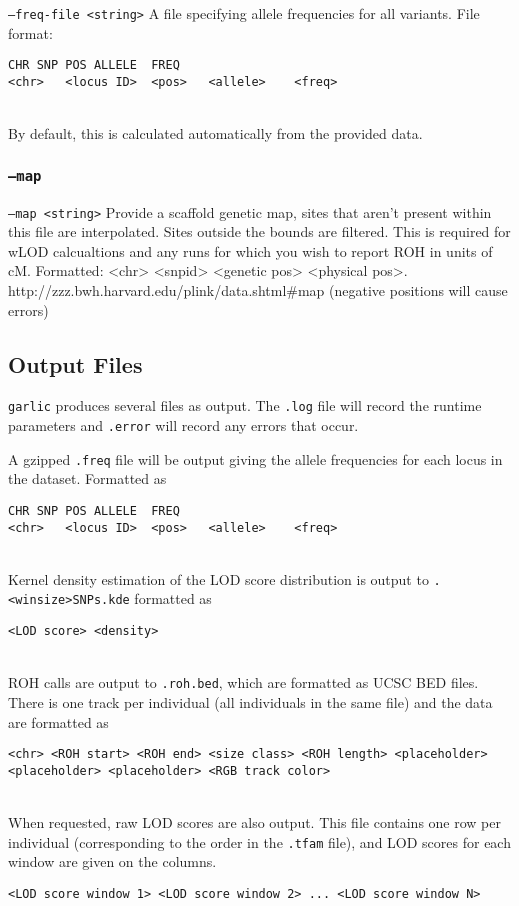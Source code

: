 \documentclass[12pt]{article}%
\begin{document}
{\tt --freq-file <string>} A file specifying allele frequencies for all variants. File format:
\begin{lstlisting}
CHR	SNP	POS	ALLELE	FREQ 
<chr>	<locus ID>	<pos>	<allele>	<freq>
\end{lstlisting}
~\\
\noindent By default, this is calculated automatically from the provided data.

\subsubsection{{\tt --map}}

{\tt --map <string>} Provide a scaffold genetic map, sites that aren't present within this file are interpolated.  Sites outside the bounds are filtered. This is required for wLOD calcualtions and any runs for which you wish to report ROH in units of cM. 
Formatted: <chr> <snpid> <genetic pos> <physical pos>. http://zzz.bwh.harvard.edu/plink/data.shtml\#map (negative positions will cause errors)

\subsection{Output Files}

{\tt garlic} produces several files as output.  The {\tt .log} file will record the runtime parameters and {\tt .error} will record any errors that occur.  

A gzipped {\tt .freq} file will be output giving the allele frequencies for each locus in the dataset.  Formatted as
\begin{lstlisting}
CHR	SNP	POS	ALLELE	FREQ
<chr>	<locus ID>	<pos>	<allele>	<freq>
\end{lstlisting}
~\\
Kernel density estimation of the LOD score distribution is output to {\tt .<winsize>SNPs.kde} formatted as
\begin{lstlisting}
<LOD score> <density>
\end{lstlisting}
~\\
ROH calls are output to {\tt .roh.bed}, which are formatted as UCSC BED files. There is one track per individual (all individuals in the same file) and the data are formatted as
\begin{lstlisting}
<chr> <ROH start> <ROH end> <size class> <ROH length> <placeholder> <placeholder> <placeholder> <RGB track color>
\end{lstlisting}
~\\
When requested, raw LOD scores are also output.  This file contains one row per individual (corresponding to the order in the {\tt .tfam} file), and LOD scores for each window are given on the columns.
\begin{lstlisting}
<LOD score window 1> <LOD score window 2> ... <LOD score window N>
\end{lstlisting}
~\\
\end{document}
